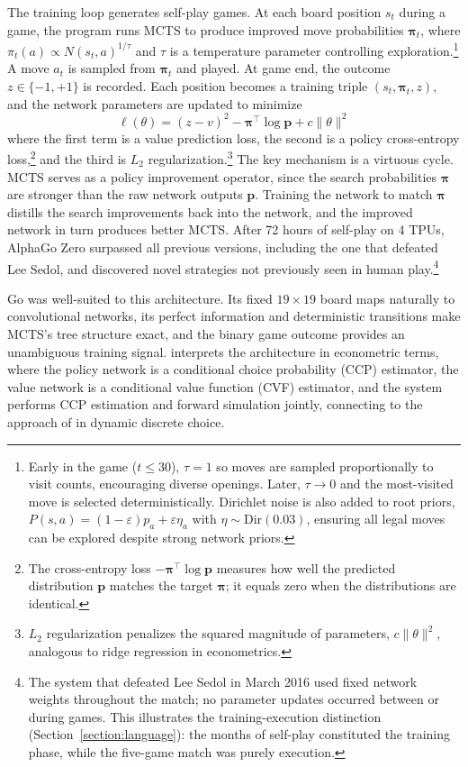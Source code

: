 The training loop generates self-play games. At each board position $s_t$ during a game, the program runs MCTS to produce improved move probabilities $\boldsymbol{\pi}_t$, where $\pi_t(a) \propto N(s_t, a)^{1/\tau}$ and $\tau$ is a temperature parameter controlling exploration.\footnote{Early in the game ($t \leq 30$), $\tau = 1$ so moves are sampled proportionally to visit counts, encouraging diverse openings. Later, $\tau \to 0$ and the most-visited move is selected deterministically. Dirichlet noise is also added to root priors, $P(s,a) = (1 - \varepsilon)p_a + \varepsilon \eta_a$ with $\eta \sim \text{Dir}(0.03)$, ensuring all legal moves can be explored despite strong network priors.} A move $a_t$ is sampled from $\boldsymbol{\pi}_t$ and played. At game end, the outcome $z \in \{-1, +1\}$ is recorded. Each position becomes a training triple $(s_t, \boldsymbol{\pi}_t, z)$, and the network parameters are updated to minimize
\begin{equation}
\ell(\theta) = (z - v)^2 - \boldsymbol{\pi}^\top \log \mathbf{p} + c \|\theta\|^2
\end{equation}
where the first term is a value prediction loss, the second is a policy cross-entropy loss,\footnote{The cross-entropy loss $-\boldsymbol{\pi}^\top \log \mathbf{p}$ measures how well the predicted distribution $\mathbf{p}$ matches the target $\boldsymbol{\pi}$; it equals zero when the distributions are identical.} and the third is $L_2$ regularization.\footnote{$L_2$ regularization penalizes the squared magnitude of parameters, $c\|\theta\|^2$, analogous to ridge regression in econometrics.} The key mechanism is a virtuous cycle. MCTS serves as a policy improvement operator, since the search probabilities $\boldsymbol{\pi}$ are stronger than the raw network outputs $\mathbf{p}$. Training the network to match $\boldsymbol{\pi}$ distills the search improvements back into the network, and the improved network in turn produces better MCTS. After 72 hours of self-play on 4 TPUs, AlphaGo Zero surpassed all previous versions, including the one that defeated Lee Sedol, and discovered novel strategies not previously seen in human play.\footnote{The system that defeated Lee Sedol in March 2016 used fixed network weights throughout the match; no parameter updates occurred between or during games. This illustrates the training-execution distinction (Section~\ref{section:language}): the months of self-play constituted the training phase, while the five-game match was purely execution.}

Go was well-suited to this architecture. Its fixed $19 \times 19$ board maps naturally to convolutional networks, its perfect information and deterministic transitions make MCTS's tree structure exact, and the binary game outcome provides an unambiguous training signal. \citet{Igami2020} interprets the architecture in econometric terms, where the policy network is a conditional choice probability (CCP) estimator, the value network is a conditional value function (CVF) estimator, and the system performs CCP estimation and forward simulation jointly, connecting to the approach of \citet{HotzMiller1993} in dynamic discrete choice.


